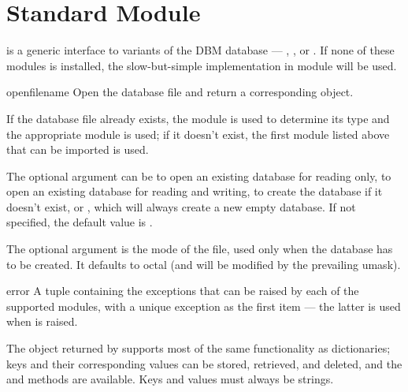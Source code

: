 \section{Standard Module }



 is a generic interface to variants of the DBM
database --- ,
, or .
If none of these modules is installed, the slow-but-simple
implementation in module  will
be used.

\begin{funcdesc}{open}{filename}
Open the database file  and return a corresponding object.

If the database file already exists, the  module is
used to determine its type and the appropriate module is used; if it
doesn't exist, the first module listed above that can be imported is
used.

The optional  argument can be
 to open an existing database for reading only,
 to open an existing database for reading and writing,
 to create the database if it doesn't exist, or
, which will always create a new empty database.  If not
specified, the default value is .

The optional  argument is the \UNIX{} mode of the file, used
only when the database has to be created.  It defaults to octal
 (and will be modified by the prevailing umask).
\end{funcdesc}

\begin{excdesc}{error}
A tuple containing the exceptions that can be raised by each of the
supported modules, with a unique exception  as
the first item --- the latter is used when  is
raised.
\end{excdesc}

The object returned by  supports most of the same
functionality as dictionaries; keys and their corresponding values can
be stored, retrieved, and deleted, and the  and
 methods are available.  Keys and values must always be
strings.




